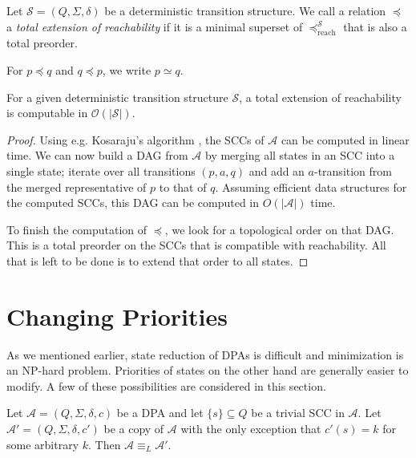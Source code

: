 \begin{defn}
	Let $\mathcal{S} = (Q, \Sigma, \delta)$ be a deterministic transition structure. We call a relation $\preceq$ a \emph{total extension of reachability} if it is a minimal superset of $\preceq_\text{reach}^\mathcal{S}$ that is also a total preorder.
	
	For $p \preceq q$ and $q \preceq p$, we write $p \simeq q$.
\end{defn}

\begin{lem}
	For a given deterministic transition structure $\mathcal{S}$, a total extension of reachability is computable in $\mathcal{O}(|\mathcal{S}|)$.
	\label{lem:general:reach_topo_lintime}
\end{lem}

\begin{proof}
	Using e.g. Kosaraju's algorithm \cite{Sharir81}, the SCCs of $\mathcal{A}$ can be computed in linear time. We can now build a DAG from $\mathcal{A}$ by merging all states in an SCC into a single state; iterate over all transitions $(p, a, q)$ and add an $a$-transition from the merged representative of $p$ to that of $q$. Assuming efficient data structures for the computed SCCs, this DAG can be computed in $O(|\mathcal{A}|)$ time.
	
	To finish the computation of $\preceq$, we look for a topological order on that DAG. This is a total preorder on the SCCs that is compatible with reachability. All that is left to be done is to extend that order to all states.
\end{proof}




\section{Changing Priorities}
As we mentioned earlier, state reduction of DPAs is difficult and minimization is an NP-hard problem. Priorities of states on the other hand are generally easier to modify. A few of these possibilities are considered in this section.

\begin{lem}
\label{lem:general:trivial_scc_dont_matter}
	Let $\mathcal{A} = (Q, \Sigma, \delta, c)$ be a DPA and let $\{s\} \subseteq Q$ be a trivial SCC in $\mathcal{A}$. Let $\mathcal{A}' = (Q, \Sigma, \delta, c')$ be a copy of $\mathcal{A}$ with the only exception that $c'(s) = k$ for some arbitrary $k$. Then $\mathcal{A} \equiv_L \mathcal{A}'$.
\end{lem}

